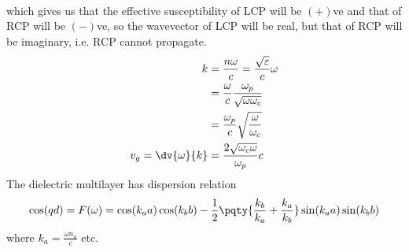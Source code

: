 \documentclass[12pt]{extarticle}
\begin{document}
\begin{outline}[enumerate]
\begin{align*}
        \end{align*}
        which gives us that the effective susceptibility of LCP will be \(( +)\)ve and that of RCP will be \(( -)\)ve, so the wavevector of LCP will be real, but that of RCP will be imaginary, i.e. RCP cannot propagate.
        \begin{align*}
            k &=  \frac{n\omega}{c} = \frac{\sqrt{\varepsilon}}{c} \omega \\
            &= \frac{\omega}{c} \frac{\omega_p}{\sqrt{\omega \omega_c}}\\
            &= \frac{\omega_p}{c} \sqrt{\frac{\omega}{\omega_c}}\\
            v_g =\dv{\omega}{k} &= \frac{2\sqrt{\omega_c \omega }}{\omega_p} c
        \end{align*}
        \1 The dielectric multilayer has dispersion relation \[
            \cos(qd) = F(\omega ) = \cos(k_a a)\cos(k_b b) - \frac{1}{2}\pqty{\frac{k_b}{k_a} + \frac{k_a}{k_b}}\sin(k_a a)\sin(k_b b)
        \]
        where \(k_a = \frac{\omega n_a}{c}\) etc. 


\end{outline}
\end{document}
